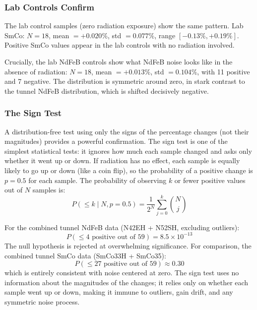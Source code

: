 \documentclass[11pt,letterpaper]{article}
\newcommand{\ndfeb}{NdFeB}
\newcommand{\smco}{SmCo}
\begin{document}
\subsubsection{Lab Controls Confirm}

The lab control samples (zero radiation exposure) show the same pattern.
Lab \smco{}: $N = 18$, mean $= +0.020\%$, std $= 0.077\%$, range
$[-0.13\%, +0.19\%]$.  Positive \smco{} values appear in the lab controls
with no radiation involved.

Crucially, the lab \ndfeb{} controls show what \ndfeb{} noise looks like in
the absence of radiation: $N = 18$, mean $= +0.013\%$, std $= 0.104\%$, with
11 positive and 7 negative.  The distribution is symmetric around zero, in
stark contrast to the tunnel \ndfeb{} distribution, which is shifted
decisively negative.

\subsubsection{The Sign Test}
\label{sec:sign_test}

A distribution-free test using only the signs of the percentage changes (not
their magnitudes) provides a powerful confirmation.  The sign test is one of
the simplest statistical tests: it ignores how much each sample changed and
asks only whether it went up or down.  If radiation has no effect, each sample
is equally likely to go up or down (like a coin flip), so the probability of a
positive change is $p = 0.5$ for each sample.  The probability of observing
$k$ or fewer positive values out of $N$ samples is:
\begin{equation}
\label{eq:sign_test}
P(\leq k \mid N, p=0.5) = \frac{1}{2^N} \sum_{j=0}^{k} \binom{N}{j}
\end{equation}

For the combined tunnel \ndfeb{} data (N42EH + N52SH, excluding outliers):
\begin{equation}
P(\leq 4 \text{ positive out of } 59) = 8.5 \times 10^{-13}
\end{equation}
The null hypothesis is rejected at overwhelming significance.  For comparison,
the combined tunnel \smco{} data (SmCo33H + SmCo35):
\begin{equation}
P(\leq 27 \text{ positive out of } 59) \approx 0.30
\end{equation}
which is entirely consistent with noise centered at zero.  The sign test uses
no information about the magnitudes of the changes; it relies only on
whether each sample went up or down, making it immune to outliers, gain
drift, and any symmetric noise process.
\end{document}

